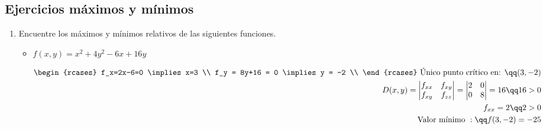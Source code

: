 \subsection{Ejercicios máximos y mínimos}
\begin{enumerate}
    \item Encuentre los máximos y mínimos relativos de las siguientes funciones.
        \begin{itemize}
            \item $\displaystyle f(x,y) = x^2+4y^2-6x+16y$ 
                \begin{center}
                   \begin{align*}
                        \begin{rcases}
                            f_x=2x-6=0 \implies x=3 \\ 
                            f_y = 8y+16 = 0 \implies y = -2 \\
                        \end{rcases}  \text{ Único punto crítico en: } \qq (3,-2) \\ 
                        D(x,y) = \begin{vmatrix}
                            f_{xx} & f_{xy} \\ 
                            f_{xy} & f_{zz} \\ 
                        \end{vmatrix} = \begin{vmatrix}
                            2 & 0 \\ 
                            0 & 8 \\ 
                        \end{vmatrix} = 16 \qq 16 > 0 \\ 
                        f_{xx} = 2 \qq 2>0 \\ 
                        \text{ Valor mínimo }: \qq f(3,-2) = -25 \\ 
                   \end{align*}
                \end{center}
            

\end{itemize}
\end{enumerate}
